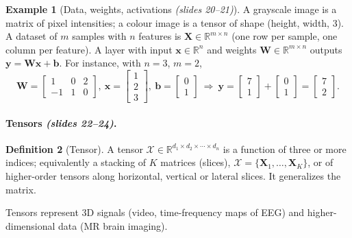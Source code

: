 \documentclass[11pt,a4paper]{article}
\newcommand{\R}{\mathbb{R}}
\newcommand{\slides}[1]{\texorpdfstring{\emph{(slides #1)}}{(slides #1)}}
\theoremstyle{definition}
\newtheorem{definition}{Definition}[section]
\newtheorem{example}[definition]{Example}
\theoremstyle{plain}
\begin{document}
\begin{example}[Data, weights, activations \slides{20--21}]
A grayscale image is a matrix of pixel intensities; a colour image is a tensor of shape (height, width, 3). A dataset of $m$ samples with $n$ features is $\mathbf X\in\R^{m\times n}$ (one row per sample, one column per feature). A layer with input $\mathbf x\in\R^n$ and weights $\mathbf W\in\R^{m\times n}$ outputs $\mathbf y=\mathbf W\mathbf x+\mathbf b$. For instance, with $n=3$, $m=2$,
\[
\mathbf W=\begin{bmatrix}1&0&2\\-1&1&0\end{bmatrix},\ 
\mathbf x=\begin{bmatrix}1\\2\\3\end{bmatrix},\ 
\mathbf b=\begin{bmatrix}0\\1\end{bmatrix}
\ \Rightarrow\ 
\mathbf y=\begin{bmatrix}7\\1\end{bmatrix}+\begin{bmatrix}0\\1\end{bmatrix}=\begin{bmatrix}7\\2\end{bmatrix}.
\]
\end{example}

\paragraph{Tensors \slides{22--24}.}
\begin{definition}[Tensor]
A tensor $\mathcal X\in\R^{d_1\times d_2\times\cdots\times d_n}$ is a function of three or more indices; equivalently a stacking of $K$ matrices (slices), $\mathcal X=\{\mathbf X_1,\dots,\mathbf X_K\}$, or of higher-order tensors along horizontal, vertical or lateral slices. It generalizes the matrix.
\end{definition}

Tensors represent 3D signals (video, time-frequency maps of EEG) and higher-dimensional data (MR brain imaging).
\end{document}
